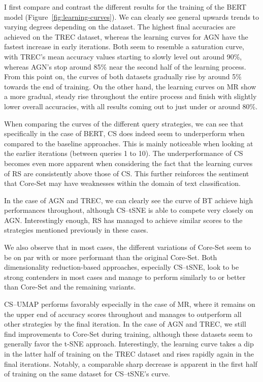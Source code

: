 \documentclass[english,bachelor,ul]{webisthesis} %
\begin{document}
I first compare and contrast the different results for the training of the BERT model (Figure~\ref{fig:learning-curves}). We can clearly see general upwards trends to varying degrees depending on the dataset. The highest final accuracies are achieved on the TREC dataset, whereas the learning curves for AGN have the fastest increase in early iterations. Both seem to resemble a saturation curve, with TREC's mean accuracy values starting to slowly level out around 90\%, whereas AGN's stop around 85\% near the second half of the learning process. From this point on, the curves of both datasets gradually rise by around 5\% towards the end of training. On the other hand, the learning curves on MR show a more gradual, steady rise throughout the entire process and finish with slightly lower overall accuracies, with all results coming out to just under or around 80\%. 

When comparing the curves of the different query strategies, we can see that specifically in the case of BERT, CS does indeed seem to underperform when compared to the baseline approaches. This is mainly noticeable when looking at the earlier iterations (between queries 1 to 10). The underperformance of CS becomes even more apparent when considering the fact that the learning curves of RS are consistently above those of CS. This further reinforces the sentiment that Core-Set may have weaknesses within the domain of text classification. 

In the case of AGN and TREC, we can clearly see the curve of BT achieve high performances throughout, although CS--tSNE is able to compete very closely on AGN. Interestingly enough, RS has managed to achieve similar scores to the strategies mentioned previously in these cases.

We also observe that in most cases, the different variations of Core-Set seem to be on par with or more performant than the original Core-Set. Both dimensionality reduction-based approaches, especially CS--tSNE, look to be strong contenders in most cases and manage to perform similarly to or better than Core-Set and the remaining variants. 

CS--UMAP performs favorably especially in the case of MR, where it remains on the upper end of accuracy scores throughout and manages to outperform all other strategies by the final iteration. In the case of AGN and TREC, we still find improvements to Core-Set during training, although these datasets seem to generally favor the t-SNE approach. Interestingly, the learning curve takes a dip in the latter half of training on the TREC dataset and rises rapidly again in the final iterations. Notably, a comparable sharp decrease is apparent in the first half of training on the same dataset for CS--tSNE's curve.
\end{document}
